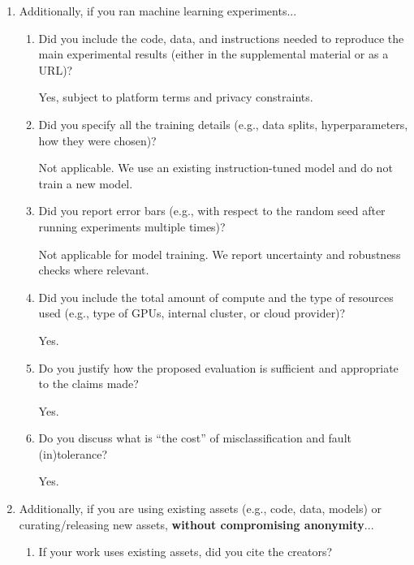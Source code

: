 \documentclass[letterpaper]{article} %
\newcommand{\answerTODO}[1]{#1}
\begin{document}
\begin{enumerate}
\begin{enumerate}
    \answerTODO{Not applicable.}

  \item Did you include complete proofs of all theoretical results?
    
    \answerTODO{Not applicable.}
\end{enumerate}

\item Additionally, if you ran machine learning experiments...
\begin{enumerate}
  \item Did you include the code, data, and instructions needed to reproduce the main experimental results (either in the supplemental material or as a URL)?
    
    \answerTODO{Yes, subject to platform terms and privacy constraints.}

  \item Did you specify all the training details (e.g., data splits, hyperparameters, how they were chosen)?
    
    \answerTODO{Not applicable. We use an existing instruction-tuned model and do not train a new model.}

  \item Did you report error bars (e.g., with respect to the random seed after running experiments multiple times)?
    
    \answerTODO{Not applicable for model training. We report uncertainty and robustness checks where relevant.}

  \item Did you include the total amount of compute and the type of resources used (e.g., type of GPUs, internal cluster, or cloud provider)?
    
    \answerTODO{Yes.}

  \item Do you justify how the proposed evaluation is sufficient and appropriate to the claims made?
    
    \answerTODO{Yes.}

  \item Do you discuss what is ``the cost'' of misclassification and fault (in)tolerance?
    
    \answerTODO{Yes.}
\end{enumerate}

\item Additionally, if you are using existing assets (e.g., code, data, models) or curating/releasing new assets, \textbf{without compromising anonymity}...
\begin{enumerate}
  \item If your work uses existing assets, did you cite the creators?
    

\end{enumerate}
\end{enumerate}
\end{document}
